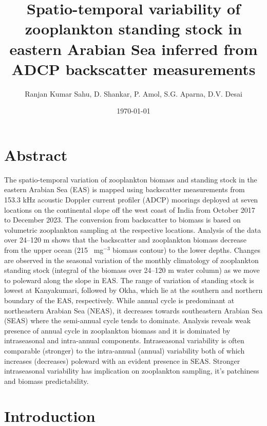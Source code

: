 \documentclass{article}
\title{Spatio-temporal variability of zooplankton standing stock in eastern Arabian Sea inferred from ADCP backscatter measurements }}
\author{Ranjan Kumar Sahu, D. Shankar, P. Amol, S.G. Aparna,  D.V. Desai}
\date{\today}
\begin{document}
	

	\maketitle
	\linenumbers
	\section*{Abstract}

The spatio-temporal variation of zooplankton biomass and standing stock in the eastern Arabian Sea (EAS) is mapped using backscatter measurements from 153.3 kHz acoustic Doppler current profiler (ADCP) moorings deployed at seven locations on the continental slope off the west coast of India from October 2017 to December 2023. The conversion from backscatter to biomass is based on volumetric zooplankton sampling at the respective locations. Analysis of the data over 24--120 m shows that the backscatter and zooplankton biomass decrease from the upper ocean (215 ~mg$^{-3}$ biomass contour) to the lower depths. Changes are observed in the seasonal variation of the monthly climatology of zooplankton standing stock (integral of the biomass over 24--120 m water column) as we move to poleward along the slope in EAS. The range of variation of standing stock is lowest at Kanyakumari, followed by Okha, which lie at the southern and northern boundary of the EAS, respectively. While annual cycle is predominant at northeastern Arabian Sea (NEAS), it decreases towards southeastern Arabian Sea (SEAS) where the semi-annual cycle tends to dominate. Analysis reveals weak presence of annual cycle in zooplankton biomass and it is dominated by intraseasonal and intra-annual components. Intraseasonal variability is often comparable (stronger) to the intra-annual (annual) variability both of which increases (decreases) poleward with an evident presence in SEAS. Stronger intraseasonal variability has implication on zooplankton sampling, it's patchiness and biomass predictability. 


	\newpage
	\section{Introduction}
\end{document}
